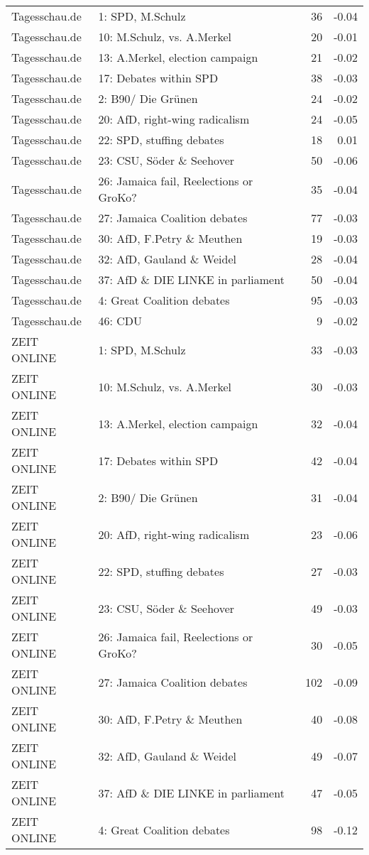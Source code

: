 \begin{adjustbox}{width=\textwidth}
\begin{tabular}{llrr}
  Tagesschau.de & 1: SPD, M.Schulz &  36 & -0.04 \\ 
  Tagesschau.de & 10: M.Schulz, vs. A.Merkel &  20 & -0.01 \\ 
  Tagesschau.de & 13: A.Merkel, election campaign &  21 & -0.02 \\ 
  Tagesschau.de & 17: Debates within SPD &  38 & -0.03 \\ 
  Tagesschau.de & 2: B90/ Die Grünen &  24 & -0.02 \\ 
  Tagesschau.de & 20: AfD, right-wing radicalism &  24 & -0.05 \\ 
  Tagesschau.de & 22: SPD, stuffing debates &  18 & 0.01 \\ 
  Tagesschau.de & 23: CSU, Söder \& Seehover &  50 & -0.06 \\ 
  Tagesschau.de & 26: Jamaica fail, Reelections or GroKo? &  35 & -0.04 \\ 
  Tagesschau.de & 27: Jamaica Coalition debates &  77 & -0.03 \\ 
  Tagesschau.de & 30: AfD, F.Petry \& Meuthen &  19 & -0.03 \\ 
  Tagesschau.de & 32: AfD, Gauland \& Weidel &  28 & -0.04 \\ 
  Tagesschau.de & 37: AfD \& DIE LINKE in parliament &  50 & -0.04 \\ 
  Tagesschau.de & 4: Great Coalition debates &  95 & -0.03 \\ 
  Tagesschau.de & 46: CDU &   9 & -0.02 \\ 
  ZEIT ONLINE & 1: SPD, M.Schulz &  33 & -0.03 \\ 
  ZEIT ONLINE & 10: M.Schulz, vs. A.Merkel &  30 & -0.03 \\ 
  ZEIT ONLINE & 13: A.Merkel, election campaign &  32 & -0.04 \\ 
  ZEIT ONLINE & 17: Debates within SPD &  42 & -0.04 \\ 
  ZEIT ONLINE & 2: B90/ Die Grünen &  31 & -0.04 \\ 
  ZEIT ONLINE & 20: AfD, right-wing radicalism &  23 & -0.06 \\ 
  ZEIT ONLINE & 22: SPD, stuffing debates &  27 & -0.03 \\ 
  ZEIT ONLINE & 23: CSU, Söder \& Seehover &  49 & -0.03 \\ 
  ZEIT ONLINE & 26: Jamaica fail, Reelections or GroKo? &  30 & -0.05 \\ 
  ZEIT ONLINE & 27: Jamaica Coalition debates & 102 & -0.09 \\ 
  ZEIT ONLINE & 30: AfD, F.Petry \& Meuthen &  40 & -0.08 \\ 
  ZEIT ONLINE & 32: AfD, Gauland \& Weidel &  49 & -0.07 \\ 
  ZEIT ONLINE & 37: AfD \& DIE LINKE in parliament &  47 & -0.05 \\ 
  ZEIT ONLINE & 4: Great Coalition debates &  98 & -0.12 \\ 
   \hline
\end{tabular}
\end{adjustbox}
